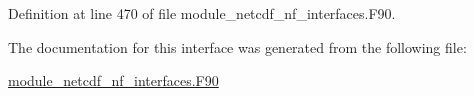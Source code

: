 Definition at line 470 of file module\+\_\+netcdf\+\_\+nf\+\_\+interfaces.\+F90.



The documentation for this interface was generated from the following file\+:\begin{DoxyCompactItemize}
\item 
\hyperlink{module__netcdf__nf__interfaces_8F90}{module\+\_\+netcdf\+\_\+nf\+\_\+interfaces.\+F90}\end{DoxyCompactItemize}
